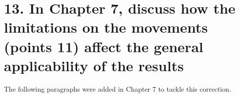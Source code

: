\documentclass[12pt]{article}
\begin{document}
\section*{13. 
In Chapter 7, discuss how the limitations 
on the movements (points 11) affect the 
general applicability of the results
}


The following paragraphs were added in Chapter 7 
to tackle this correction.
\end{document}
